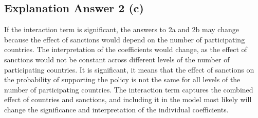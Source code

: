 \documentclass[12pt,letterpaper]{article}
\begin{document}
\begin{enumerate}
\begin{enumerate}
			\section*{Explanation Answer 2 (c)} 
		\vspace{.25cm}
		\noindent If the interaction term is significant, the answers to 2a and 2b may change because the effect of sanctions would depend on the number of participating countries. The interpretation of the coefficients would change, as the effect of sanctions would not be constant across different levels of the number of participating countries.
		It is significant, it means that the effect of sanctions on the probability of supporting the policy is not the same for all levels of the number of participating countries. The interaction term captures the combined effect of countries and sanctions, and including it in the model most likely will change the significance and interpretation of the individual coefficients.
		
	\end{enumerate}
	\end{enumerate}
\end{document}
